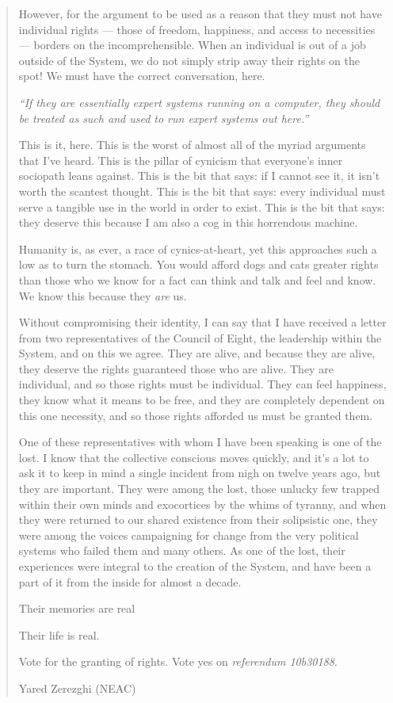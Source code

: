 \begin{quote}
However, for the argument to be used as a reason that they must not have individual rights — those of freedom, happiness, and access to necessities — borders on the incomprehensible. When an individual is out of a job outside of the System, we do not simply strip away their rights on the spot! We must have the correct conversation, here.

\emph{``If they are essentially expert systems running on a computer, they should be treated as such and used to run expert systems out here.''}

This is it, here. This is the worst of almost all of the myriad arguments that I've heard. This is the pillar of cynicism that everyone's inner sociopath leans against. This is the bit that says: if I cannot see it, it isn't worth the scantest thought. This is the bit that says: every individual must serve a tangible use in the world in order to exist. This is the bit that says: they deserve this because I am also a cog in this horrendous machine.

Humanity is, as ever, a race of cynics-at-heart, yet this approaches such a low as to turn the stomach. You would afford dogs and cats greater rights than those who we know for a fact can think and talk and feel and know. We know this because they \emph{are} us.

Without compromising their identity, I can say that I have received a letter from two representatives of the Council of Eight, the leadership within the System, and on this we agree. They are alive, and because they are alive, they deserve the rights guaranteed those who are alive. They are individual, and so those rights must be individual. They can feel happiness, they know what it means to be free, and they are completely dependent on this one necessity, and so those rights afforded us must be granted them.

One of these representatives with whom I have been speaking is one of the lost. I know that the collective conscious moves quickly, and it's a lot to ask it to keep in mind a single incident from nigh on twelve years ago, but they are important. They were among the lost, those unlucky few trapped within their own minds and exocortices by the whims of tyranny, and when they were returned to our shared existence from their solipsistic one, they were among the voices campaigning for change from the very political systems who failed them and many others. As one of the lost, their experiences were integral to the creation of the System, and have been a part of it from the inside for almost a decade.

Their memories are real

Their life is real.

Vote for the granting of rights. Vote yes on \emph{referendum 10b30188}.

Yared Zerezghi (NEAC)
\end{quote}


